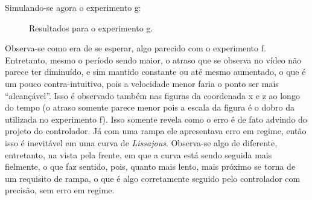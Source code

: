 \documentclass[a4paper]{article}
\begin{document}
	Simulando-se agora o experimento g:
	\begin{figure}[H]
		\centering
		\caption{Resultados para o experimento g.}
	\end{figure}
	Observa-se como era de se esperar, algo parecido com o experimento f. Entretanto,
	mesmo o per\'iodo sendo maior, o atraso que se observa no v\'ideo n\~ao parece ter
	diminu\'ido, e sim mantido constante ou at\'e mesmo aumentado, o que \'e um pouco
	contra-intuitivo, pois a velocidade menor faria o ponto ser mais ``alcan\c{c}\'avel''.
	Isso \'e observado tamb\'em nas figuras da coordenada x e z ao longo do tempo (o atraso
	somente parece menor pois a escala da figura \'e o dobro da utilizada no experimento f).
	Isso somente revela como o erro \'e de fato advindo do projeto do controlador. J\'a
	com uma rampa ele apresentava erro em regime, ent\~ao isso \'e inevit\'avel em uma
	curva de \textit{Lissajous}. Observa-se algo de diferente, entretanto, na vista pela
	frente, em que a curva est\'a sendo seguida mais fielmente, o que faz sentido, pois,
	quanto mais lento, mais pr\'oximo se torna de um requisito de rampa, o que \'e algo
	corretamente seguido pelo controlador com precis\~ao, sem erro em regime.
\end{document}

